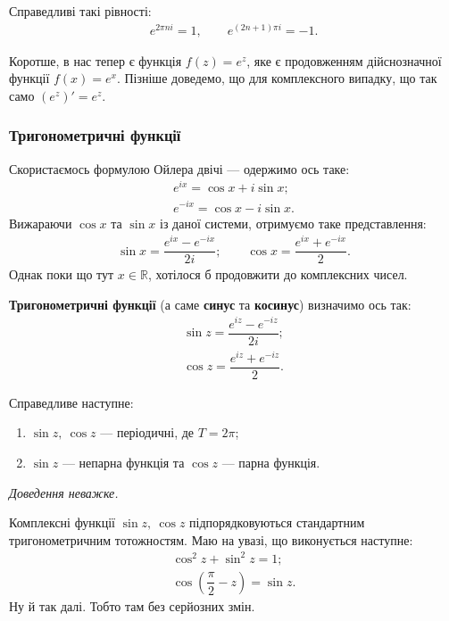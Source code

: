 \documentclass{math_library}
\begin{document}
\begin{corollary}
Справедливі такі рівності:
\begin{align*}
e^{2\pi n i} = 1, \qquad e^{(2n+1)\pi i} = -1.
\end{align*}
\end{corollary}

Коротше, в нас тепер є функція $f(z) = e^z$, яке є продовженням дійснозначної функції $f(x) = e^x$. Пізніше доведемо, що для комплексного випадку, що так само $(e^z)' = e^z$.

\subsubsection{Тригонометричні функції}
Скористаємось формулою Ойлера двічі --- одержимо ось таке:
\begin{align*}
e^{ix} = \cos x + i \sin x; \\
e^{-ix} = \cos x - i \sin x.
\end{align*}
Вижараючи $\cos x$ та $\sin x$ із даної системи, отримуємо таке представлення:
\begin{align*}
\sin x = \dfrac{e^{ix} - e^{-ix}}{2i}; \qquad \cos x = \dfrac{e^{ix} + e^{-ix}}{2}.
\end{align*}
Однак поки що тут $x \in \mathbb{R}$, хотілося б продовжити до комплексних чисел.

\begin{definition}
\textbf{Тригонометричні функції} (а саме \textbf{синус} та \textbf{косинус}) визначимо ось так:
\begin{align*}
\sin z = \dfrac{e^{iz} - e^{-iz}}{2i}; \\
\cos z = \dfrac{e^{iz} + e^{-iz}}{2}.
\end{align*}
\end{definition}

\begin{proposition}
Справедливе наступне:
\begin{enumerate}[nosep,wide=0pt,label={\arabic*)}]
\item $\sin z,\ \cos z$ --- періодичні, де $T = 2\pi$;
\item $\sin z$ --- непарна функція та $\cos z$ --- парна функція.
\end{enumerate}
\textit{Доведення неважке.}
\end{proposition}

\begin{remark}
Комплексні функції $\sin z,\ \cos z$ підпорядковуються стандартним тригонометричним тотожностям. Маю на увазі, що виконується наступне:
\begin{align*}
\cos^2 z + \sin^2 z = 1; \\
\cos \left( \dfrac{\pi}{2} - z \right) = \sin z.
\end{align*}
Ну й так далі. Тобто там без серйозних змін.
\end{remark}
\end{document}
